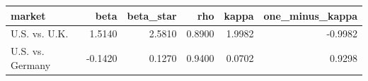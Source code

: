 \begin{tabular}{lrrrrr}
\toprule
market & beta & beta_star & rho & kappa & one_minus_kappa \\
\midrule
U.S. vs. U.K. & 1.5140 & 2.5810 & 0.8900 & 1.9982 & -0.9982 \\
U.S. vs. Germany & -0.1420 & 0.1270 & 0.9400 & 0.0702 & 0.9298 \\
\bottomrule
\end{tabular}
